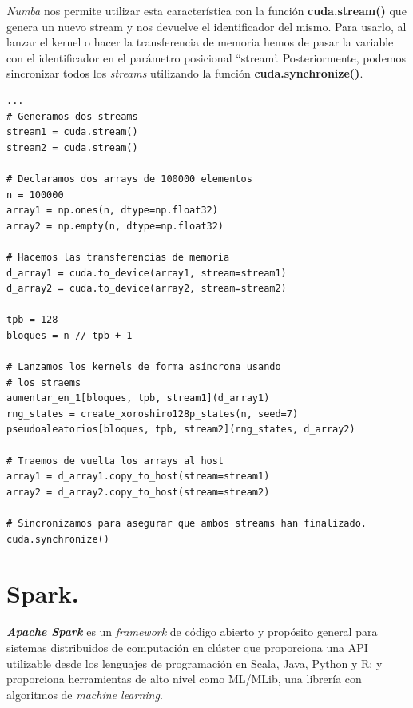 \textit{Numba} nos permite utilizar esta característica con la función \textbf{cuda.stream()} que genera un nuevo stream y nos devuelve el identificador del mismo. Para usarlo, al lanzar el kernel o hacer la transferencia de memoria hemos de pasar la variable con el identificador en el parámetro posicional ``stream'. Posteriormente, podemos sincronizar todos los \textit{streams} utilizando la función \textbf{cuda.synchronize()}. \\

\begin{code}
\begin{verbatim}
...
# Generamos dos streams
stream1 = cuda.stream()
stream2 = cuda.stream()

# Declaramos dos arrays de 100000 elementos
n = 100000 
array1 = np.ones(n, dtype=np.float32)
array2 = np.empty(n, dtype=np.float32)

# Hacemos las transferencias de memoria
d_array1 = cuda.to_device(array1, stream=stream1)
d_array2 = cuda.to_device(array2, stream=stream2)

tpb = 128
bloques = n // tpb + 1

# Lanzamos los kernels de forma asíncrona usando
# los straems
aumentar_en_1[bloques, tpb, stream1](d_array1)
rng_states = create_xoroshiro128p_states(n, seed=7)
pseudoaleatorios[bloques, tpb, stream2](rng_states, d_array2)

# Traemos de vuelta los arrays al host
array1 = d_array1.copy_to_host(stream=stream1)
array2 = d_array2.copy_to_host(stream=stream2)

# Sincronizamos para asegurar que ambos streams han finalizado.
cuda.synchronize()
\end{verbatim}
\label{code:streams}
\end{code}

\section{Spark.}



\textbf{\textit{Apache Spark}} es un \textit{framework} de código abierto y propósito general para sistemas distribuidos de computación en clúster que proporciona una API utilizable desde los lenguajes de programación en Scala, Java, Python y R; y proporciona herramientas de alto nivel como ML/MLib, una librería con algoritmos de \textit{machine learning}. \\

